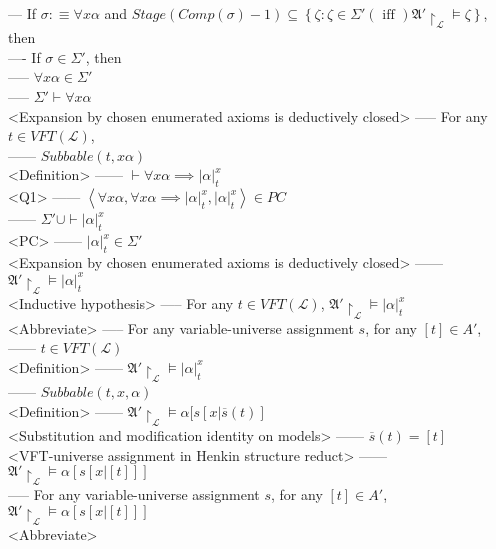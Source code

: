 \documentclass{book}
\newcommand{\is}{:\equiv}
\newcommand{\txtiff}{\left(\text{ iff }\right)}
\newcommand{\extend}[1]{\overline{#1}}
\newcommand{\set}[1]{\left\{ #1 \right\}}
\newcommand{\seq}[1]{\left\langle #1 \right\rangle}
\newcommand{\sub}[3]{\left|#1\right|_{#3}^{#2}}
\begin{document}
			--- If $\sigma \is \forall x \alpha$ and $Stage(Comp(\sigma) - 1) \subseteq \set{\zeta: \zeta \in \Sigma' \txtiff \mathfrak{A}' \upharpoonright_\mathcal{L} \vDash \zeta}$, then \\
				---- If $\sigma \in \Sigma'$, then \\
					----- $\forall x \alpha \in \Sigma'$ \\
					----- $\Sigma' \vdash \forall x \alpha$ \\ <Expansion by chosen enumerated axioms is deductively closed>
					----- For any $t \in VFT(\mathcal{L})$, \\
						------ $Subbable(t, x \alpha)$ \\ <Definition>
						------ $\vdash \forall x \alpha \implies \sub{\alpha}{x}{t}$ \\ <Q1>
						------ $\seq{\forall x \alpha, \forall x \alpha \implies \sub{\alpha}{x}{t}, \sub{\alpha}{x}{t}} \in PC$ \\
						------ $\Sigma' \cup \vdash \sub{\alpha}{x}{t}$ \\ <PC>
						------ $\sub{\alpha}{x}{t} \in \Sigma'$ \\ <Expansion by chosen enumerated axioms is deductively closed>
						------ $\mathfrak{A}' \upharpoonright_\mathcal{L} \vDash \sub{\alpha}{x}{t}$ \\ <Inductive hypothesis>
					----- For any $t \in VFT(\mathcal{L})$, $\mathfrak{A}' \upharpoonright_\mathcal{L} \vDash \sub{\alpha}{x}{t}$ \\ <Abbreviate>
					----- For any variable-universe assignment $s$, for any $[t] \in A'$, \\
						------ $t \in VFT(\mathcal{L})$ \\ <Definition>
						------ $\mathfrak{A}' \upharpoonright_\mathcal{L} \vDash \sub{\alpha}{x}{t}$ \\
						------ $Subbable(t, x, \alpha)$ \\ <Definition>
						------ $\mathfrak{A}' \upharpoonright_\mathcal{L} \vDash \alpha[s[x|\extend{s}(t)]$ \\ <Substitution and modification identity on models>
						------ $\extend{s}(t) = [t]$ \\ <VFT-universe assignment in Henkin structure reduct>
						------ $\mathfrak{A}' \upharpoonright_\mathcal{L} \vDash \alpha[s[x|[t]]]$ \\
					----- For any variable-universe assignment $s$, for any $[t] \in A'$, $\mathfrak{A}' \upharpoonright_\mathcal{L} \vDash \alpha[s[x|[t]]]$ \\ <Abbreviate>
\end{document}
